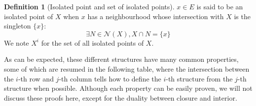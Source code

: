 \documentclass{article}
\theoremstyle{definition}
\newtheorem{definition}{Definition}[section]
\theoremstyle{remark}
\theoremstyle{example}
\theoremstyle{notation}
\newcommand{\isol}[1]{{{#1}^i}}
\begin{document}
\begin{definition}[Isolated point and set of isolated points]
		$x \in E$ is said to be an isolated point of $X$ when $x$ has a neighbourhood whose intersection with $X$ is the singleton $\{x\}$:
				$$\exists N \in \mathcal{N}(X), X \cap N = \{x\}$$
		We note $\isol{X}$ for the set of all isolated points of $X$.
\end{definition}

As can be expected, these different structures have many common properties, some of which are resumed in the following table, where the intersection between the $i$-th row and $j$-th column tells how to define the $i$-th structure from the $j$-th structure when possible. Although each property can be easily proven, we will not discuss these proofs here, except for the duality between closure and interior.
\end{document}

